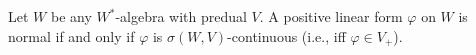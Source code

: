 Let $W$ be any $W^*$-algebra with predual $V$. A positive linear form $\varphi$ on $W$ is normal if and only if $\varphi$ is $\sigma(W, V)$-continuous (i.e., iff $\varphi \in V_+$).
